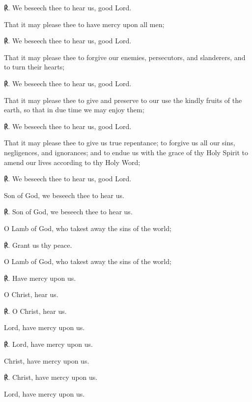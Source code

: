 \begin{multicols}{2}
    ℟. We beseech thee to hear us, good Lord.
    \par\noindent
    That it may please thee to have mercy upon all men;
    
    ℟. We beseech thee to hear us, good Lord.
    \par\noindent
    That it may please thee to forgive our enemies, persecutors, and slanderers, and to turn their hearts;
    
    ℟. We beseech thee to hear us, good Lord.
    \par\noindent
    That it may please thee to give and preserve to our use the kindly fruits of the earth, so that in due time we may enjoy them;
    
    ℟. We beseech thee to hear us, good Lord.
    \par\noindent
    That it may please thee to give us true repentance; to forgive us all our sins, negligences, and ignorances; and to endue us with the grace of thy Holy Spirit to amend our lives according to thy Holy Word;
    
    ℟. We beseech thee to hear us, good Lord.
    \par\noindent
    Son of God, we beseech thee to hear us.
    
    ℟. Son of God, we beseech thee to hear us.
    \par\noindent
    O Lamb of God, who takest away the sins of the world;
    
    ℟. Grant us thy peace.
    \par\noindent
    O Lamb of God, who takest away the sins of the world;
    
    ℟. Have mercy upon us.
    \par\noindent
    O Christ, hear us.
    
    ℟. O Christ, hear us.
    \par\noindent
    Lord, have mercy upon us.
    
    ℟. Lord, have mercy upon us.
    \par\noindent
    Christ, have mercy upon us.
    
    ℟. Christ, have mercy upon us.
    \par\noindent
    Lord, have mercy upon us.
    

\end{multicols}

